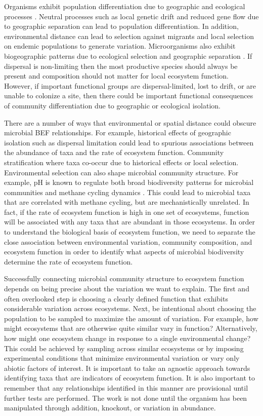 \documentclass{article}
\begin{document}
Organisms exhibit population differentiation due to geographic and ecological
processes \citep{wright1943}. Neutral processes such as local genetic drift and
reduced gene flow due to geographic separation can lead to population
differentiation. In addition, environmental distance can lead to selection
against migrants \citep{hendry2004} and local selection on endemic populations
to generate variation. Microorganisms also exhibit biogeographic patterns due to
ecological selection and geographic separation \citep{martiny2006}. If dispersal
is non-limiting then the most productive species should always be present and
composition should not matter for local ecosystem function. However, if important
functional groups are dispersal-limited, lost to drift, or are unable to
colonize a site, then there could be important functional consequences of
community differentiation due to geographic or ecological isolation.

There are a number of ways that environmental or spatial distance could obscure
microbial BEF relationships. For example, historical effects of geographic
isolation such as dispersal limitation could lead to spurious associations
between the abundance of taxa and the rate of ecosystem function. Community
stratification where taxa co-occur due to historical effects or local selection.
Environmental selection can also shape microbial community
structure. For example, pH is known to regulate both broad biodiversity patterns for
microbial communities \citep{fierer2006} and methane cycling dynamics
\citep{ye2012}. This could lead to microbial taxa that are correlated with
methane cycling, but are mechanistically unrelated. In fact, if the rate of
ecosystem function is high in one set of ecosystems, function will be
associated with any taxa that are abundant in those ecosystems. 
In order to understand the biological basis of ecosystem function, we need to
separate the close association between environmental variation, community
composition, and ecosystem function in order to identify what aspects of
microbial biodiversity determine the rate of ecosystem function.

Successfully connecting microbial community structure to ecosystem function
depends on being precise about the variation we want to explain. The first and
often overlooked step is choosing a
clearly defined function that exhibits considerable variation across ecosystems. 
Next, be intentional about choosing the
population to be sampled to maximize the amount of variation. For example, how
might ecosystems that are otherwise quite similar vary in function?
Alternatively, how might one ecosystem change in response to a single
environmental change? This could be achieved by sampling across similar ecosystems 
or by imposing experimental conditions that minimize environmental variation or
vary only abiotic factors of interest. 
It is important to take an agnostic approach towards identifying taxa that are
indicators of ecosystem function. It is also important to remember that any
relationships identified in this manner are provisional until further tests are
performed. The work is not done until the organism has been manipulated through
addition, knockout, or variation in abundance.
\end{document}
